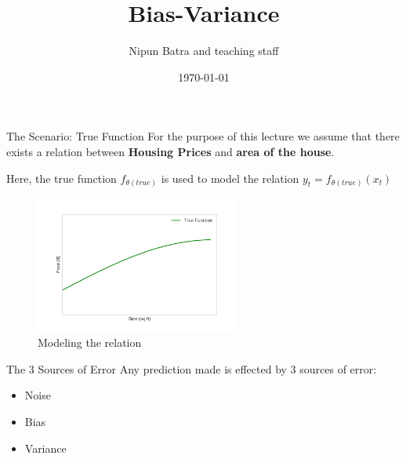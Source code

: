 \documentclass{beamer}
\title{Bias-Variance}
\date{\today}
\author{Nipun Batra and teaching staff}
\institute{IIT Gandhinagar}
\begin{document}
	\maketitle

\begin{frame}{The Scenario: True Function}
\vspace*{0.4cm}
For the purpose of this lecture we assume that there exists a relation between \textbf{Housing Prices} and \textbf{area of the house}.
\pause

Here, the true function $f_{\theta (true)}$ is used to model the relation $y_t = f_{\theta (true)}(x_t)$
\begin{figure}
\includegraphics[width=0.6\textwidth]{images/true.pdf}
\vspace*{-0.3cm}
\caption{Modeling the relation}
\end{figure}
\end{frame}

\begin{frame}{The 3 Sources of Error}
Any prediction made is effected by 3 sources of error:
\begin{itemize}
\item Noise
\item Bias
\item Variance
\end{itemize}
\end{frame}
\end{document}
